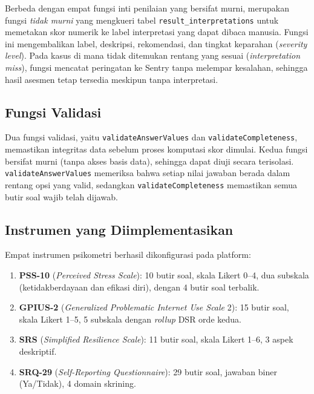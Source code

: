 Berbeda dengan empat fungsi inti penilaian yang bersifat murni, \texttt{} merupakan fungsi \textit{tidak murni} yang mengkueri tabel \texttt{result\_interpretations} untuk memetakan skor numerik ke label interpretasi yang dapat dibaca manusia. Fungsi ini mengembalikan label, deskripsi, rekomendasi, dan tingkat keparahan (\textit{severity level}). Pada kasus di mana tidak ditemukan rentang yang sesuai (\textit{interpretation miss}), fungsi mencatat peringatan ke Sentry tanpa melempar kesalahan, sehingga hasil asesmen tetap tersedia meskipun tanpa interpretasi.

\subsection{Fungsi Validasi}

Dua fungsi validasi, yaitu \texttt{validateAnswerValues} dan \texttt{validateCompleteness}, memastikan integritas data sebelum proses komputasi skor dimulai. Kedua fungsi bersifat murni (tanpa akses basis data), sehingga dapat diuji secara terisolasi. \texttt{validateAnswerValues} memeriksa bahwa setiap nilai jawaban berada dalam rentang opsi yang valid, sedangkan \texttt{validateCompleteness} memastikan semua butir soal wajib telah dijawab.

\subsection{Instrumen yang Diimplementasikan}

Empat instrumen psikometri berhasil dikonfigurasi pada platform:

\begin{enumerate}[leftmargin=2cm]
  \item \textbf{PSS-10} (\textit{Perceived Stress Scale}): 10 butir soal, skala Likert 0--4, dua subskala (ketidakberdayaan dan efikasi diri), dengan 4 butir soal terbalik.
  \item \textbf{GPIUS-2} (\textit{Generalized Problematic Internet Use Scale} 2): 15 butir soal, skala Likert 1--5, 5 subskala dengan \textit{rollup} DSR orde kedua.
  \item \textbf{SRS} (\textit{Simplified Resilience Scale}): 11 butir soal, skala Likert 1--6, 3 aspek deskriptif.
  \item \textbf{SRQ-29} (\textit{Self-Reporting Questionnaire}): 29 butir soal, jawaban biner (Ya/Tidak), 4 domain skrining.
\end{enumerate}

